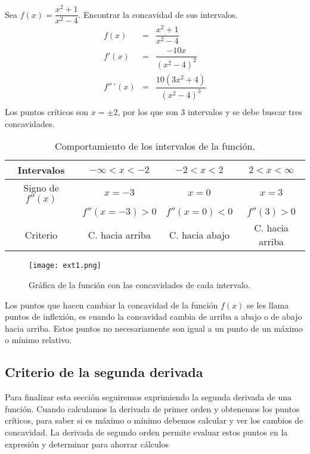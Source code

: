 \begin{myexample}
Sea $f(x)=\dfrac{x^{2}+1}{x^{2}-4}$. Encontrar la concavidad de sus intervalos.
\begin{eqnarray*}
f(x)&=&\dfrac{x^{2}+1}{x^{2}-4} \\
f'(x)&=&\dfrac{-10x}{(x^{2}-4)^{2}} \\
f''´(x)&=&\dfrac{10(3x^{2}+4)}{(x^{2}-4)^{3}} \\
\end{eqnarray*}
Los puntos críticos son $x=\pm 2$, por los que son 3 intervalos y se debe buscar tres concavidades.

\begin{table}[h!]
\begin{center}
		\begin{tabular}{|c|c|c|c|}
		\hline
		Intervalos & $-\infty <x<-2$   & $-2<x<2$&$2<x<\infty$ \\ 
		\hline
		 Signo de $f''(x)$&$x=-3$ &$x=0$ &$x=3$   \\
		 & $f''(x=-3)>0$  & $f''(x=0)<0$&$f''(3)>0$  \\
		\hline
		Criterio &C. hacia arriba &C. hacia abajo& C. hacia arriba \\
		\hline
		\end{tabular}
		\caption{Comportamiento de los intervalos de la función.}
\end{center}
\end{table}
 \begin{center}
\begin{figure}[h!]
\centering
\texttt{[image: ext1.png]}
\caption{Gráfica de la función con las concavidades de cada intervalo.} \label{ext1}
\end{figure}
\end{center}
\end{myexample}

Los puntos que hacen cambiar la concavidad de la función $f(x)$ se les llama puntos de inflexión, es cuando la concavidad cambia de arriba a abajo o de abajo hacia arriba. Estos puntos no necesariamente son igual a un punto de un máximo o mínimo relativo.

\subsection{Criterio de la segunda derivada}
Para finalizar esta sección seguiremos exprimiendo la segunda derivada de una función. Cuando calculamos la derivada de primer orden y obtenemos los puntos críticos, para saber si es máximo o mínimo debemos calcular y ver los cambios de concavidad. La derivada de segundo orden permite evaluar estos puntos en la expresión y determinar para ahorrar cálculos

